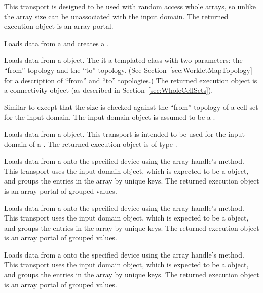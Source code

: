 \begin{description}
  This transport is designed to be used with random access whole arrays, so unlike  the array size can be unassociated with the input domain.
  The returned execution object is an array portal.
\item[\vtkmcontarg{TransportTagAtomicArray}] 
  Loads data from a  and creates a .
\item[\vtkmcontarg{TransportTagCellSetIn}] 
  Loads data from a  object.
  The  it a templated class with two parameters: the ``from'' topology and the ``to'' topology.
  (See Section~\ref{sec:WorkletMapTopology} for a description of ``from'' and ``to'' topologies.)
  The returned execution object is a connectivity object (as described in Section~\ref{sec:WholeCellSets}).
\item[\vtkmcontarg{TransportTagTopologyFieldIn}] 
  Similar to  except that the size is checked against the ``from'' topology of a cell set for the input domain.
  The input domain object is assumed to be a .
\item[\vtkmcontarg{TransportTagKeysIn}] 
  Loads data from a  object.
  This transport is intended to be used for the input domain of a .
  The returned execution object is of type .
\item[\vtkmcontarg{TransportTagKeyedValuesIn}] 
  Loads data from a  onto the specified device using the array handle's  method.
  This transport uses the input domain object, which is expected to be a  object, and groups the entries in the array by unique keys.
  The returned execution object is an array portal of grouped values.
\item[\vtkmcontarg{TransportTagKeyedValuesOut}] 
  Loads data from a  onto the specified device using the array handle's  method.
  This transport uses the input domain object, which is expected to be a  object, and groups the entries in the array by unique keys.
  The returned execution object is an array portal of grouped values.
\item[\vtkmcontarg{TransportTagKeyedValuesInOut}] 
  Loads data from a  onto the specified device using the array handle's  method.
  This transport uses the input domain object, which is expected to be a  object, and groups the entries in the array by unique keys.
  The returned execution object is an array portal of grouped values.
\end{description}

